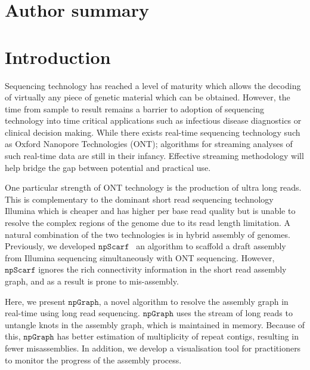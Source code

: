 \documentclass[10pt,letterpaper]{article}
\newcommand{\npscarf}{$\mathtt{npScarf}$}
\newcommand{\npgraph}{$\mathtt{npGraph}$}
\begin{document}
\section*{Author summary}


\linenumbers

\section*{Introduction}

Sequencing technology has reached a level of maturity which allows the decoding of virtually any piece of genetic material
which  can be obtained. 
However, the time from sample to result remains a barrier to adoption of 
sequencing technology into time critical applications such as infectious disease diagnostics or clinical decision making.  While
there exists real-time sequencing technology such as Oxford Nanopore Technologies (ONT);  algorithms for streaming analyses  of such real-time data are still
in their infancy. Effective streaming methodology will help bridge the gap between potential and practical use. 

One particular strength of ONT technology is the production of ultra long reads. This is complementary to the dominant
short read sequencing technology Illumina which is cheaper and has higher per base read quality
but is unable to resolve the complex regions of the genome due to its read length limitation. A natural combination of
the two technologies is in hybrid assembly of genomes. Previously, we developed \npscarf{}~\cite{Cao2017scaffolding} an algorithm to 
scaffold a draft assembly from Illumina sequencing simultaneously with ONT sequencing.  However, \npscarf{} ignores the rich  connectivity information in the short read assembly graph, and as a result is prone to mis-assembly.



 Here, we present \npgraph{}, a novel algorithm to resolve the assembly graph in real-time using long read 
sequencing. \npgraph{} uses the stream of long reads to untangle knots in the assembly graph, which is maintained in memory.
 Because of this, \npgraph{} has better estimation of multiplicity of repeat contigs, resulting in fewer misassemblies. 
 In addition, we develop a visualisation tool for practitioners to monitor
the progress of the assembly process.
\end{document}
